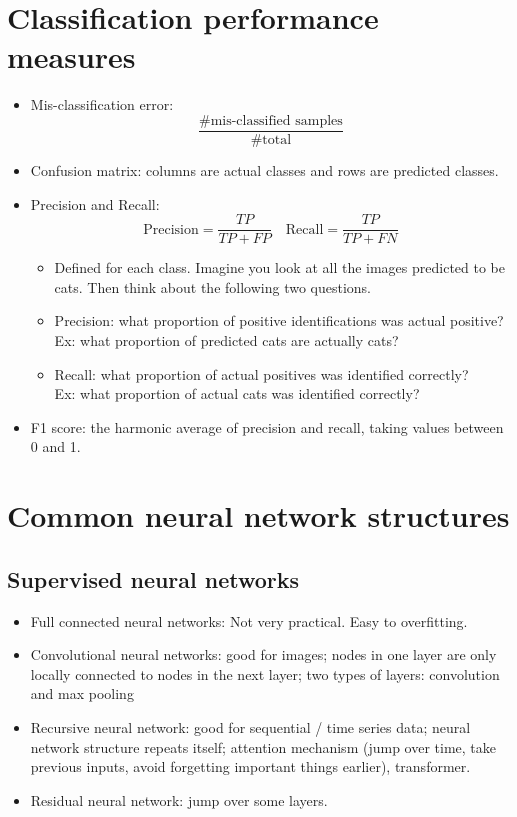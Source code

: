 \documentclass[twoside,12pt]{article}
\begin{document}
\section{Classification performance measures}
\begin{itemize}
\item Mis-classification error: $$\frac{\# \text{mis-classified samples}}{\#\text{total}}$$
\item Confusion matrix: columns are actual classes and rows are predicted classes.
\item Precision and Recall: $$\text{Precision} = \frac{TP}{TP + FP} \quad \text{Recall} = \frac{TP}{TP + FN}$$
\begin{itemize}
\item Defined for each class. Imagine you look at all the images predicted to be cats. Then think about the following two questions. 
\item Precision: what proportion of positive identifications was actual positive? \\
Ex: what proportion of predicted cats are actually cats?
\item Recall: what proportion of actual positives was identified correctly? \\
Ex: what proportion of actual cats was identified correctly? 
\end{itemize}
\item F1 score: the harmonic average of precision and recall, taking values between 0 and 1.
\end{itemize}

\section{Common neural network structures}
\subsection{Supervised neural networks}
\begin{itemize}
\item Full connected neural networks: Not very practical. Easy to overfitting.
\item Convolutional neural networks: good for images; nodes in one layer are only locally connected to nodes in the next layer; two types of layers: convolution and max pooling
\item Recursive neural network: good for sequential / time series data; neural network structure repeats itself; attention mechanism (jump over time, take previous inputs, avoid forgetting important things earlier), transformer. 
\item Residual neural network: jump over some layers. 
\end{itemize}
\end{document}
